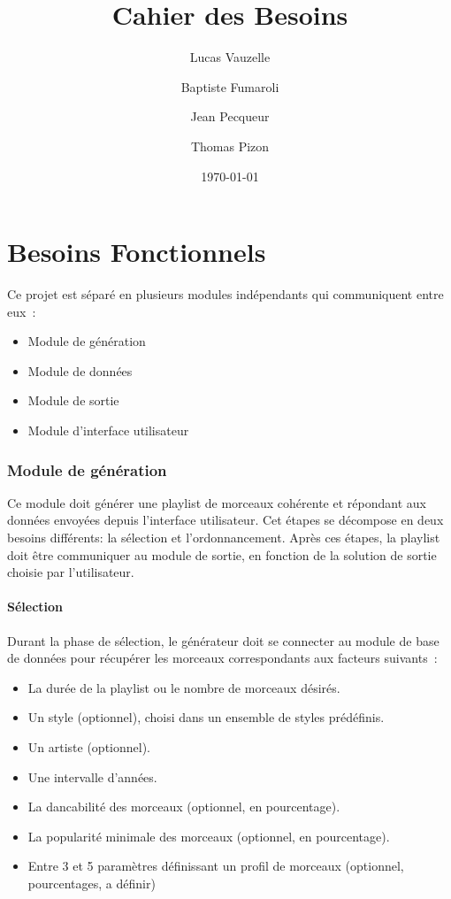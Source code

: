 \documentclass{article}
\title{Cahier des Besoins}
\author{Lucas Vauzelle \and Baptiste Fumaroli \and Jean Pecqueur \and Thomas Pizon}
\date{\today}
\begin{document}
\maketitle

\part{Besoins Fonctionnels}

Ce projet est séparé en plusieurs modules indépendants qui communiquent entre
eux~:
\begin{itemize}
\item Module de génération
\item Module de données
\item Module de sortie
\item Module d'interface utilisateur
\end{itemize}

\section{Module de génération}

Ce module doit générer une playlist de morceaux cohérente et répondant aux
données envoyées depuis l’interface utilisateur. Cet étapes se décompose en
deux besoins différents: la sélection et l'ordonnancement. Après ces étapes,
la playlist doit être communiquer au module de sortie, en fonction de la
solution de sortie choisie par l’utilisateur.

\subsection{Sélection}

Durant la phase de sélection, le générateur doit se connecter au module de
base de données pour récupérer les morceaux correspondants aux facteurs
suivants~:
\begin{itemize}
\item La durée de la playlist ou le nombre de morceaux désirés.
\item Un style (optionnel), choisi dans un ensemble de styles prédéfinis.
\item Un artiste (optionnel).
\item Une intervalle d'années.
\item La dancabilité des morceaux (optionnel, en pourcentage).
\item La popularité minimale des morceaux (optionnel, en pourcentage).
\item Entre 3 et 5 paramètres définissant un profil de morceaux (optionnel,
pourcentages, a définir)
\end{itemize}
\end{document}
